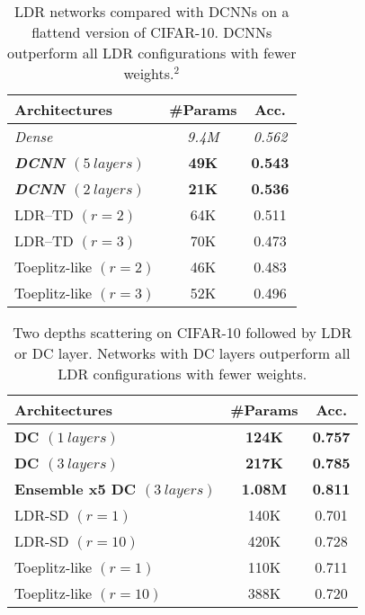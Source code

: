\begin{table}
  \centering
  \caption{LDR networks compared with DCNNs on a flattend version of CIFAR-10. DCNNs outperform all LDR configurations with fewer weights.$^2$}
  \begin{tabular}{lcc}
    \toprule
    \textbf{Architectures} & \textbf{\#Params} & \textbf{Acc.}  \\
    \midrule
    \textit{Dense} & \textit{9.4M}	& \textit{0.562} \\
    \textbf{\textit{DCNN $(5\ layers)$}} & \textbf{49K}	& \textbf{0.543} \\
    \textbf{\textit{DCNN $(2\ layers)$}} & \textbf{21K} & \textbf{0.536} \\
    LDR--TD	$(r = 2)$	        & 64K	& 0.511 \\
    LDR--TD	$(r = 3)$	        & 70K	& 0.473 \\
    Toeplitz-like $(r=2)$	    & 46K	& 0.483 \\
    Toeplitz-like $(r =3)$	    & 52K    & 0.496 \\
    \bottomrule
    \end{tabular}
    \label{table:xp_ldr}
\end{table}

\begin{table}
  \centering
  \caption{Two depths scattering on CIFAR-10 followed by LDR or DC layer. Networks with DC layers outperform all LDR configurations with fewer weights.}
  \begin{tabular}{lcc}
    \toprule
    \textbf{Architectures} & \textbf{\#Params} & \textbf{Acc.}  \\
    \midrule
    \textbf{DC $(1\ layers)$} & \textbf{124K} & \textbf{0.757} \\
    \textbf{DC $(3\ layers)$} & \textbf{217K} & \textbf{0.785} \\
    \textbf{Ensemble x5 DC $(3\ layers)$} &  \textbf{1.08M} & \textbf{0.811} \\
    LDR-SD $(r=1)$ & 140K & 0.701 \\
    LDR-SD $(r=10)$ & 420K & 0.728 \\
    Toeplitz-like $(r=1)$ & 110K & 0.711 \\
    Toeplitz-like $(r=10)$ & 388K & 0.720 \\
    \bottomrule
    \end{tabular}
    \label{table:xp_ldr_scattering}
\end{table}



